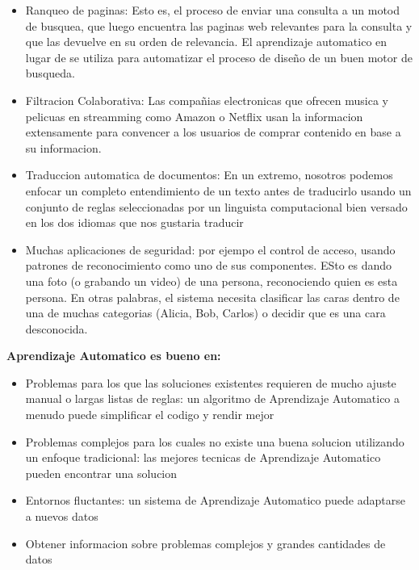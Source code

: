 \begin{itemize}
    \item Ranqueo de paginas: Esto es, el proceso de enviar una consulta a un motod de busquea, que luego encuentra las paginas web relevantes para la consulta y que las devuelve en su orden de relevancia. El aprendizaje automatico en lugar de se utiliza para automatizar el proceso de diseño de un buen motor de busqueda.
    
    \item Filtracion Colaborativa: Las compañias electronicas que ofrecen musica y pelicuas en streamming como Amazon o Netflix usan la informacion extensamente para convencer a los usuarios de comprar contenido en base a su informacion.
    
    \item Traduccion automatica de documentos: En un extremo, nosotros podemos enfocar un completo entendimiento de un texto antes de traducirlo usando un conjunto de reglas seleccionadas por un linguista computacional bien versado en los dos idiomas que nos gustaria traducir
    
    \item Muchas aplicaciones de seguridad: por ejempo el control de acceso, usando patrones de reconocimiento como uno de sus componentes. ESto es dando una foto (o grabando un video) de una persona, reconociendo quien es esta persona. En otras palabras, el sistema necesita clasificar las caras dentro de una de muchas categorias (Alicia, Bob, Carlos) o decidir que es una cara desconocida.
    
\end{itemize}

\textbf{Aprendizaje Automatico es bueno en:}

\begin{itemize}
    \item Problemas para los que las soluciones existentes requieren de mucho ajuste manual o largas listas de reglas: un algoritmo de Aprendizaje Automatico a menudo puede simplificar el codigo y rendir mejor
    
    \item Problemas complejos para los cuales no existe una buena solucion utilizando un enfoque tradicional: las mejores tecnicas de Aprendizaje Automatico pueden encontrar una solucion
    
    \item Entornos fluctantes: un sistema de Aprendizaje Automatico puede adaptarse a nuevos datos
    
    \item Obtener informacion sobre problemas complejos y grandes cantidades de datos
    
\end{itemize}

